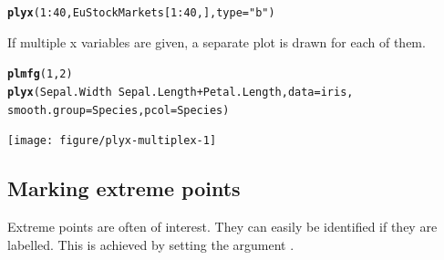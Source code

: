 \documentclass[11pt]{article}\usepackage[]{graphicx}\usepackage[]{color}
\makeatletter
\newcommand{\hlnum}[1]{\textcolor[rgb]{0.686,0.059,0.569}{#1}}%
\newcommand{\hlstr}[1]{\textcolor[rgb]{0.192,0.494,0.8}{#1}}%
\newcommand{\hlopt}[1]{\textcolor[rgb]{0,0,0}{#1}}%
\newcommand{\hlstd}[1]{\textcolor[rgb]{0.345,0.345,0.345}{#1}}%
\newcommand{\hlkwc}[1]{\textcolor[rgb]{0.333,0.667,0.333}{#1}}%
\newcommand{\hlkwd}[1]{\textcolor[rgb]{0.737,0.353,0.396}{\textbf{#1}}}%
\newenvironment{kframe}{%
 \def\at@end@of@kframe{}%
 \ifinner\ifhmode%
  \def\at@end@of@kframe{\end{minipage}}%
  \begin{minipage}{\columnwidth}%
 \fi\fi%
 \def\FrameCommand##1{\hskip\@totalleftmargin \hskip-\fboxsep
 \colorbox{shadecolor}{##1}\hskip-\fboxsep
     \hskip-\linewidth \hskip-\@totalleftmargin \hskip\columnwidth}%
 \MakeFramed {\advance\hsize-\width
   \@totalleftmargin\z@ \linewidth\hsize
   \@setminipage}}%
 {\par\unskip\endMakeFramed%
 \at@end@of@kframe}
\newenvironment{knitrout}{}{} %
\makeatother
\begin{document}
\begin{knitrout}
\color{fgcolor}\begin{kframe}
\begin{alltt}
\hlkwd{plyx}\hlstd{(}\hlnum{1}\hlopt{:}\hlnum{40}\hlstd{, EuStockMarkets[}\hlnum{1}\hlopt{:}\hlnum{40}\hlstd{,],} \hlkwc{type}\hlstd{=}\hlstr{"b"}\hlstd{)}
\end{alltt}


{\ttfamily\noindent\bfseries\color{errorcolor}{\#\# Error in `[.data.frame`(lpldata, , lvarnames, drop = FALSE): undefined columns selected}}\end{kframe}
\end{knitrout}

If multiple x variables are given, a separate plot is drawn for each of them.
\begin{knitrout}
\color{fgcolor}\begin{kframe}
\begin{alltt}
\hlkwd{plmfg}\hlstd{(}\hlnum{1}\hlstd{,}\hlnum{2}\hlstd{)}
\hlkwd{plyx}\hlstd{(Sepal.Width}\hlopt{~}\hlstd{Sepal.Length}\hlopt{+}\hlstd{Petal.Length,} \hlkwc{data}\hlstd{=iris,}
     \hlkwc{smooth.group}\hlstd{=Species,} \hlkwc{pcol}\hlstd{=Species)}
\end{alltt}


{\ttfamily\noindent\bfseries\color{errorcolor}{\#\# Error in smoothline\$y[lig, 1]: incorrect number of dimensions}}\end{kframe}
\texttt{[image: figure/plyx-multiplex-1]} 

\end{knitrout}


\subsection{Marking extreme points}

Extreme points are often of interest. They can easily be identified if they 
are labelled. This is achieved by setting the argument .
\end{document}
